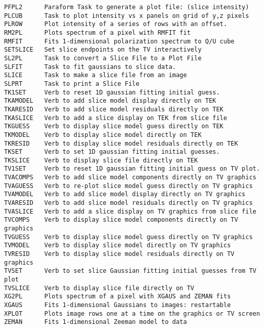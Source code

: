 
\vskip 0.5pt
\bbve\begin{verbatim}
PFPL2      Paraform Task to generate a plot file: (slice intensity)
PLCUB      Task to plot intensity vs x panels on grid of y,z pixels
PLROW      Plot intensity of a series of rows with an offset.
RM2PL      Plots spectrum of a pixel with RMFIT fit
RMFIT      Fits 1-dimensional polarization spectrum to Q/U cube
SETSLICE   Set slice endpoints on the TV interactively
SL2PL      Task to convert a Slice File to a Plot File
SLFIT      Task to fit gaussians to slice data.
SLICE      Task to make a slice file from an image
SLPRT      Task to print a Slice File
TK1SET     Verb to reset 1D gaussian fitting initial guess.
TKAMODEL   Verb to add slice model display directly on TEK
TKARESID   Verb to add slice model residuals directly on TEK
TKASLICE   Verb to add a slice display on TEK from slice file
TKGUESS    Verb to display slice model guess directly on TEK
TKMODEL    Verb to display slice model directly on TEK
TKRESID    Verb to display slice model residuals directly on TEK
TKSET      Verb to set 1D gaussian fitting initial guesses.
TKSLICE    Verb to display slice file directly on TEK
TV1SET     Verb to reset 1D gaussian fitting initial guess on TV plot.
TVACOMPS   Verb to add slice model components directly on TV graphics
TVAGUESS   Verb to re-plot slice model guess directly on TV graphics
TVAMODEL   Verb to add slice model display directly on TV graphics
TVARESID   Verb to add slice model residuals directly on TV graphics
TVASLICE   Verb to add a slice display on TV graphics from slice file
TVCOMPS    Verb to display slice model components directly on TV graphics
TVGUESS    Verb to display slice model guess directly on TV graphics
TVMODEL    Verb to display slice model directly on TV graphics
TVRESID    Verb to display slice model residuals directly on TV graphics
TVSET      Verb to set slice Gaussian fitting initial guesses from TV plot
TVSLICE    Verb to display slice file directly on TV
XG2PL      Plots spectrum of a pixel with XGAUS and ZEMAN fits
XGAUS      Fits 1-dimensional Gaussians to images: restartable
XPLOT      Plots image rows one at a time on the graphics or TV screen
ZEMAN      Fits 1-dimensional Zeeman model to data
\end{verbatim}\eve


